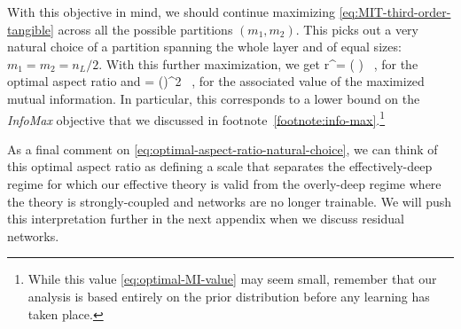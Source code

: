 With this objective in mind, we should continue maximizing \eqref{eq:MIT-third-order-tangible} across all the possible partitions $(m_1, m_2)$. This picks out
a very natural choice of a partition spanning the whole layer and of equal sizes: $m_1=m_2=n_L/2$.
With this further maximization, we get
\be\label{eq:optimal-aspect-ratio-natural-choice}
r^{\star}= \le( \ri) \, ,
\ee
for the optimal aspect ratio and
\be\label{eq:optimal-MI-value}
\MI{}= \le(\ri)^2 \, ,
\ee
for the associated value of the maximized mutual information. In particular, this corresponds to a lower bound on the \emph{InfoMax} objective that we discussed in footnote~\ref{footnote:info-max}.\footnote{
    While this value \eqref{eq:optimal-MI-value} may seem small, remember that our analysis is based entirely on the prior distribution  before any learning has taken place. 
}

As a final comment on \eqref{eq:optimal-aspect-ratio-natural-choice}, we can think of this optimal aspect ratio as defining a scale that separates the effectively-deep regime for which our effective theory is valid from the overly-deep regime where the theory is strongly-coupled and networks are no longer trainable. We will push this interpretation further in the next appendix when we discuss residual networks.





